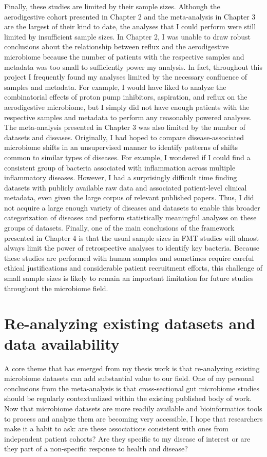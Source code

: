 Finally, these studies are limited by their sample sizes.
Although the aerodigestive cohort presented in Chapter 2 and the meta-analysis in Chapter 3 are the largest of their kind to date, the analyses that I could perform were still limited by insufficient sample sizes.
In Chapter 2, I was unable to draw robust conclusions about the relationship between reflux and the aerodigestive microbiome because the number of patients with the respective samples and metadata was too small to sufficiently power my analysis.
In fact, throughout this project I frequently found my analyses limited by the necessary confluence of samples and metadata.
For example, I would have liked to analyze the combinatorial effects of proton pump inhibitors, aspiration, and reflux on the aerodigestive microbiome, but I simply did not have enough patients with the respective samples and metadata to perform any reasonably powered analyses.
The meta-analysis presented in Chapter 3 was also limited by the number of datasets and diseases.
Originally, I had hoped to compare disease-associated microbiome shifts in an unsupervised manner to identify patterns of shifts common to similar types of diseases.
For example, I wondered if I could find a consistent group of bacteria associated with inflammation across multiple inflammatory diseases.
However, I had a surprisingly difficult time finding datasets with publicly available raw data and associated patient-level clinical metadata, even given the large corpus of relevant published papers.
Thus, I did not acquire a large enough variety of diseases and datasets to enable this broader categorization of diseases and perform statistically meaningful analyses on these groups of datasets.
Finally, one of the main conclusions of the framework presented in Chapter 4 is that the usual sample sizes in FMT studies will almost always limit the power of retrospective analyses to identify key bacteria.
Because these studies are performed with human samples and sometimes require careful ethical justifications and considerable patient recruitment efforts, this challenge of small sample sizes is likely to remain an important limitation for future studies throughout the microbiome field.

\section{Re-analyzing existing datasets and data availability}

A core theme that has emerged from my thesis work is that re-analyzing existing microbiome datasets can add substantial value to our field.
One of my personal conclusions from the meta-analysis is that cross-sectional gut microbiome studies should be regularly contextualized within the existing published body of work.
Now that microbiome datasets are more readily available and bioinformatics tools to process and analyze them are becoming very accessible, I hope that researchers make it a habit to ask: are these associations consistent with ones from independent patient cohorts? Are they specific to my disease of interest or are they part of a non-specific response to health and disease?

